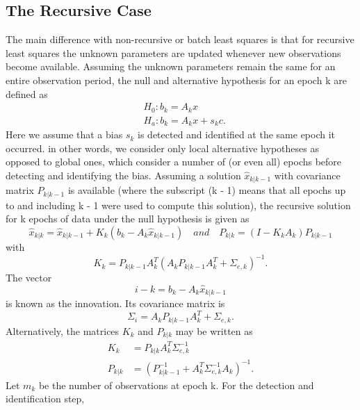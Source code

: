 	\subsection{The Recursive Case}
	The main difference with non-recursive or batch least squares is that for recursive least
	squares the unknown parameters are updated whenever new observations become available. Assuming the unknown parameters remain the same for an entire observation period,
	the null and alternative hypothesis for an epoch k are defined as 
	\begin{equation*}
	\begin{split}
	&H_0:b_k=A_kx   \\
	&H_a:b_k=A_kx +s_kc.
	\end{split}
	\end{equation*}
	Here we assume that a bias $s_k$ is detected and identified at the same epoch it occurred.
	in other words, we consider only local alternative hypotheses as opposed to global ones,
	which consider a number of (or even all) epochs before detecting and identifying the bias.
	Assuming a solution $\hat{x}_{k|k-1}$ with covariance matrix $P_{k|k-1}$ is available (where the subscript (k - 1) means that all epochs up to and including k - 1 were used to compute
	this solution), the recursive solution for k epochs of data under the null hypothesis is given
	as
	\begin{equation*}
	\hat{x}_{k|k}=\hat{x}_{k|k-1}+K_k(b_k-A_k\hat{x}_{k|k-1}) 
	\quad and \quad
	P_{k|k}=(I-K_kA_k)P_{k|k-1}
	\end{equation*}
	with
	\begin{equation*}
	K_k=P_{k|k-1}A^T_k(A_kP_{k|k-1}A^T_k+\Sigma_{e,k})^{-1}.
	\end{equation*}
	The vector
	\begin{equation}
	i-k=b_k-A_k\hat{x}_{k|k-1}
	\end{equation}
	is known as the innovation. Its covariance matrix is
	\begin{equation}
	\Sigma_i=A_kP_{k|k-1}A^T_k+\Sigma_{e,k}.
	\end{equation}
	Alternatively, the matrices $K_k$ and $P_{k|k}$ may be written as
	\begin{equation*}
	\begin{split}
	K_k &= P_{k|k}A^T_k\Sigma^{-1}_{e,k}\\
	P_{k|k} &=(P^{-1}_{k|k-1}+A^T_k\Sigma^{-1}_{e,k}A_k)^{-1}.
	\end{split}
	\end{equation*}
	Let $m_k$ be the number of observations at epoch k. For the detection and identification step,

